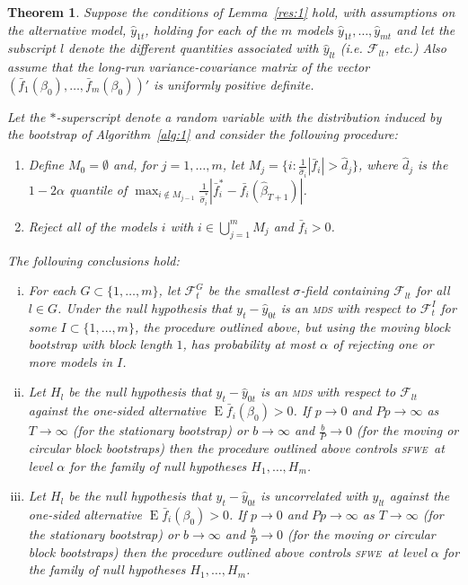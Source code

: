 \documentclass[10pt,fleqn,draft]{article}
\newtheorem{thm}{Theorem}
\theoremstyle{definition}
\DeclareMathOperator{\E}{E}
\newcommand{\mds}{\textsc{mds}}
\newcommand{\sfwe}{\textsc{sfwe}}
\begin{document}
\begin{thm}\label{res:2}
  Suppose the conditions of Lemma~\ref{res:1} hold, with assumptions
  on the alternative model, $\hat{y}_{1t}$, holding for each of the
  $m$ models $\hat{y}_{1t}, \dots, \hat{y}_{mt}$ and let the subscript
  $l$ denote the different quantities associated with $\hat{y}_{lt}$
  (i.e. $\mathcal{F}_{lt}$, etc.)  Also assume that the long-run
  variance-covariance matrix of the vector
  $(\bar{f}_1(\beta_0),\dots,\bar{f}_m(\beta_0))'$ is uniformly
  positive definite.

  Let the $*$-superscript denote a random variable with the
  distribution induced by the bootstrap of Algorithm~\ref{alg:1} and
  consider the following procedure:
  \begin{enumerate}
  \item Define $M_0 = \emptyset$ and, for $j = 1,\dots,m$, let $M_j =
    \{i : \tfrac1{\hat\sigma_i} |\bar{f}_{i}| > \hat{d}_j\}$, where
    $\hat{d}_j$ is the $1-2 \alpha$ quantile of $\max_{i \notin
      M_{j-1}} \tfrac{1}{\hat{\sigma}_i^{*}}|\bar{f}_{i}^{*} -
    \bar{f_i}(\hat{\beta}_{T+1})|$.
  \item Reject all of the models $i$ with $i \in \bigcup_{j=1}^m M_j$
    and $\bar f_i > 0$.
  \end{enumerate}
  The following conclusions hold:
  \begin{enumerate}[i.]
  \item\label{it:1} For each $G \subset \{1,\dots,m\}$, let
    $\mathcal{F}_t^G$ be the smallest $\sigma$-field containing
    $\mathcal{F}_{lt}$ for all $l \in G$.  Under the null hypothesis
    that $y_t - \hat{y}_{0t}$ is an \textsl{\mds} with respect to
    $\mathcal{F}_t^I$ for some $I \subset \{1,\dots,m\}$, the
    procedure outlined above, but using the moving block bootstrap
    with block length $1$, has probability at most $\alpha$ of rejecting
    one or more models in $I$.
  \item\label{it:2} Let $H_l$ be the null hypothesis that $y_t -
    \hat{y}_{0t}$ is an \textsl{\mds} with respect to $\mathcal{F}_{lt}$
    against the one-sided alternative $\E \bar f_i(\beta_0) > 0$.  If
    $p \to 0$ and $P p \to \infty$ as $T \to \infty$ (for the
    stationary bootstrap) or $b \to \infty$ and $\frac{b}{P} \to 0$
    (for the moving or circular block bootstraps) then the procedure
    outlined above controls \sfwe\ at level $\alpha$ for the family of
    null hypotheses $H_1,\dots,H_m$.
  \item\label{it:3} Let $H_l$ be the null hypothesis that $y_t -
    \hat{y}_{0t}$ is uncorrelated with $\hat{y}_{lt}$ against the
    one-sided alternative $\E \bar f_i(\beta_0) > 0$.  If $p \to 0$
    and $P p \to \infty$ as $T \to \infty$ (for the stationary
    bootstrap) or $b \to \infty$ and $\frac{b}{P} \to 0$ (for the
    moving or circular block bootstraps) then the procedure outlined
    above controls \sfwe\ at level $\alpha$ for the family of null
    hypotheses $H_1,\dots,H_m$.
  \end{enumerate}
\end{thm}
\end{document}
